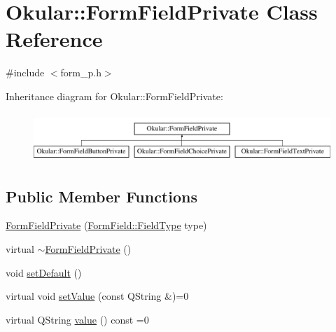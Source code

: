 \hypertarget{classOkular_1_1FormFieldPrivate}{\section{Okular\+:\+:Form\+Field\+Private Class Reference}
\label{classOkular_1_1FormFieldPrivate}
}


{\ttfamily \#include $<$form\+\_\+p.\+h$>$}

Inheritance diagram for Okular\+:\+:Form\+Field\+Private\+:\begin{figure}[H]
\begin{center}
\leavevmode
\includegraphics[height=1.857380cm]{classOkular_1_1FormFieldPrivate}
\end{center}
\end{figure}
\subsection*{Public Member Functions}
\begin{DoxyCompactItemize}
\item 
\hyperlink{classOkular_1_1FormFieldPrivate_aaf4956b42549d09728750a47148aace3}{Form\+Field\+Private} (\hyperlink{classOkular_1_1FormField_a46e9c2bd0942dfe55408c8c1aa5363cf}{Form\+Field\+::\+Field\+Type} type)
\item 
virtual \hyperlink{classOkular_1_1FormFieldPrivate_a455a173a1126e8dbde73000c928288e0}{$\sim$\+Form\+Field\+Private} ()
\item 
void \hyperlink{classOkular_1_1FormFieldPrivate_a8b755662a6683230dcbcfbe93a23815e}{set\+Default} ()
\item 
virtual void \hyperlink{classOkular_1_1FormFieldPrivate_a379271a28220778ad6893d9387926256}{set\+Value} (const Q\+String \&)=0
\item 
virtual Q\+String \hyperlink{classOkular_1_1FormFieldPrivate_a60e3dd3a4107a3d4b346fe5dab57cd73}{value} () const =0
\end{DoxyCompactItemize}
